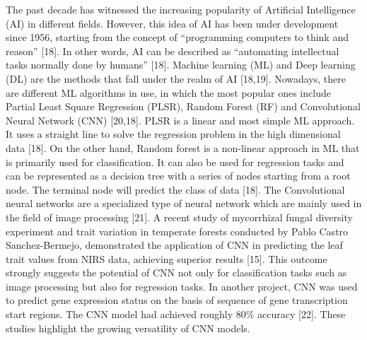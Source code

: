 \documentclass[12pt,a4paper]{report}
\begin{document}
The past decade has witnessed the increasing popularity of  Artificial Intelligence (AI) in different fields. However, this idea of AI has been under development since 1956, starting from the concept of “programming computers to think and reason” [18]. In other words, AI can be described as “automating intellectual tasks normally done by humans” [18]. Machine learning (ML) and Deep learning (DL) are the methods that fall under the realm of AI [18,19]. 
Nowadays, there are different ML algorithms in use, in which the most popular ones include Partial Least Square Regression (PLSR), Random Forest (RF) and Convolutional Neural Network (CNN) [20,18]. PLSR is a linear and most simple ML approach. It uses a straight line to solve the regression problem in the high dimensional data [18]. On the other hand,  Random forest is a non-linear approach in ML that is primarily used for classification. It can also 
be used for regression tasks and can be represented as a decision tree with a series of nodes starting from a root node. The terminal node will predict the class of data [18]. The Convolutional neural networks are a specialized type of neural network which are mainly used in the field of image processing [21]. A recent study of mycorrhizal fungal diversity experiment and  trait variation in temperate forests  conducted by Pablo Castro Sanchez-Bermejo, 
demonstrated the application of CNN in predicting the leaf trait values from NIRS data, achieving superior results [15]. This outcome strongly suggests the potential of CNN not only for classification tasks such as image processing but also for regression tasks. In another project, CNN was used to predict gene expression status on the basis of sequence of gene transcription start regions. The CNN model had achieved roughly 80\% accuracy [22]. 
These studies highlight the growing versatility of CNN models. \\
\end{document}
